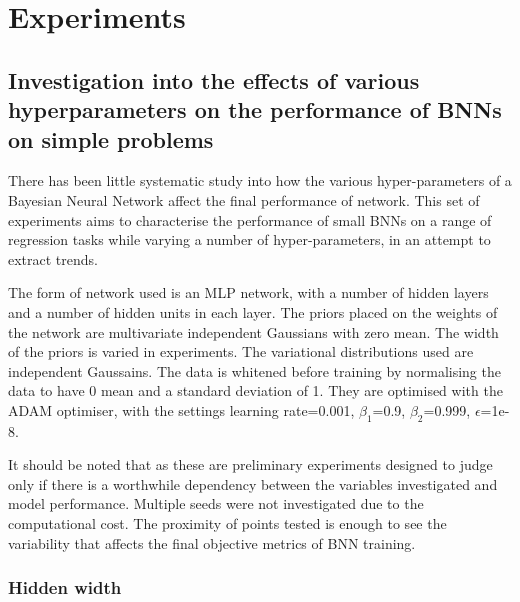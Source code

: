 
\chapter{Experiments}

\ifpdf
    \graphicspath{{Chapter5/Figs/Raster/}{Chapter5/Figs/PDF/}{Chapter5/Figs/}}
\else
    \graphicspath{{Chapter5/Figs/Vector/}{Chapter5/Figs/}}
\fi

\section{Investigation into the effects of various hyperparameters on the performance of BNNs on simple problems} \label{sec:hypparam}

There has been little systematic study into how the various hyper-parameters of a Bayesian Neural Network affect the final performance of network. This set of experiments aims to characterise the performance of small BNNs on a range of regression tasks while varying a number of hyper-parameters, in an attempt to extract trends.

The form of network used is an MLP network, with a number of hidden layers and a number of hidden units in each layer. The priors placed on the weights of the network are multivariate independent Gaussians with zero mean. The width of the priors is varied in experiments. The variational distributions used are independent Gaussains. The data is whitened before training by normalising the data to have 0 mean and a standard deviation of 1. They are optimised with the ADAM optimiser, with the settings learning rate=0.001, \( \beta_1 \)=0.9, \( \beta_2 \)=0.999, \( \epsilon \)=1e-8.

It should be noted that as these are preliminary experiments designed to judge only if there is a worthwhile dependency between the variables investigated and model performance. Multiple seeds were not investigated due to the computational cost. The proximity of points tested is enough to see the variability that affects the final objective metrics of BNN training.

\FloatBarrier
\subsection{Hidden width}


